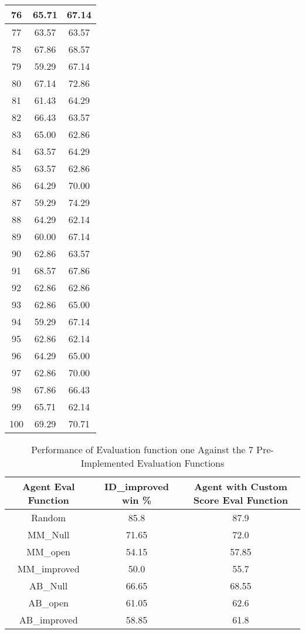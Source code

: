 \documentclass[11pt]{article}
\begin{document}
\begin{longtable}[c]{| c | c |c |}
76 & 65.71 & 67.14 \\ \hline
77 & 63.57 & 63.57 \\ \hline
78 & 67.86 & 68.57 \\ \hline
79 & 59.29 & 67.14 \\ \hline
80 & 67.14 & 72.86 \\ \hline
81 & 61.43 & 64.29 \\ \hline
82 & 66.43 & 63.57 \\ \hline
83 & 65.00 & 62.86 \\ \hline
84 & 63.57 & 64.29 \\ \hline
85 & 63.57 & 62.86 \\ \hline
86 & 64.29 & 70.00 \\ \hline
87 & 59.29 & 74.29 \\ \hline
88 & 64.29 & 62.14 \\ \hline
89 & 60.00 & 67.14 \\ \hline
90 & 62.86 & 63.57 \\ \hline
91 & 68.57 & 67.86 \\ \hline
92 & 62.86 & 62.86 \\ \hline
93 & 62.86 & 65.00 \\ \hline
94 & 59.29 & 67.14 \\ \hline
95 & 62.86 & 62.14 \\ \hline
96 & 64.29 & 65.00 \\ \hline
97 & 62.86 & 70.00 \\ \hline
98 & 67.86 & 66.43 \\ \hline
99 & 65.71 & 62.14 \\ \hline
100 & 69.29 & 70.71 \\ \hline
\end{longtable}

\begin{table}[h!]
\caption{Performance of Evaluation function one Against the 7 Pre-Implemented Evaluation Functions}
\centering
\begin{tabular}{||c | c| c||} 
 \hline
Agent Eval Function & ID\_improved win \% & Agent with Custom Score Eval Function \\ \hline
Random & 85.8 & 87.9 \\ \hline
MM\_Null & 71.65 & 72.0 \\ \hline
MM\_open & 54.15 & 57.85 \\ \hline
MM\_improved & 50.0 & 55.7 \\ \hline
AB\_Null & 66.65 & 68.55 \\ \hline
AB\_open & 61.05 & 62.6 \\ \hline
AB\_improved & 58.85 & 61.8 \\ \hline
\end{tabular}
\label{eval_fun1}
\end{table}
\end{document}
